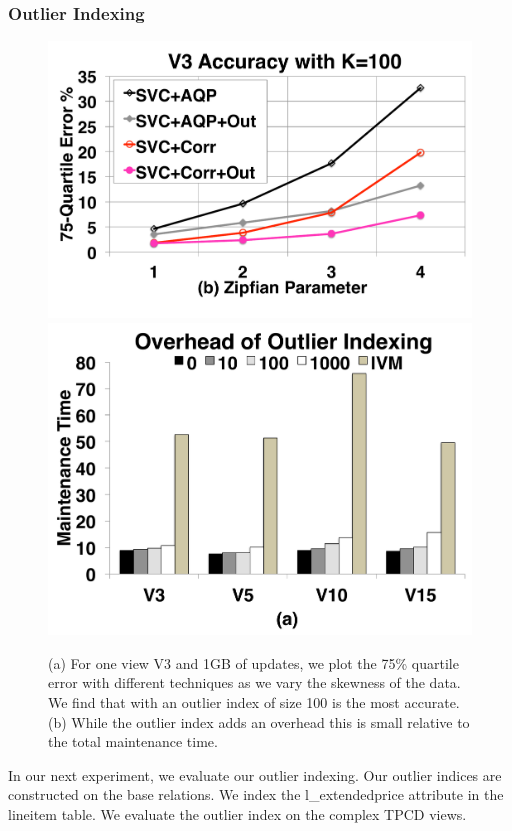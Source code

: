 \subsubsection{Outlier Indexing}

\begin{figure}[t]
\centering
 \includegraphics[scale=0.13]{exp/msoi_2.pdf}
 \includegraphics[scale=0.13]{exp/msoi_1.pdf}\vspace{-1em}
 \caption{(a) For one view V3 and 1GB of updates, we plot the 75\% quartile error with different techniques as we vary the skewness of the data. We find that \svc with an outlier index of size 100 is the most accurate. (b) While the outlier index adds an overhead this is small relative to the total maintenance time. \vspace{-1em}\label{exp5-oi}}
\end{figure}
In our next experiment, we evaluate our outlier indexing.
Our outlier indices are constructed on the base relations.
We index the \textsf{l\_extendedprice} attribute in the \textsf{lineitem} table.
We evaluate the outlier index on the complex TPCD views.

